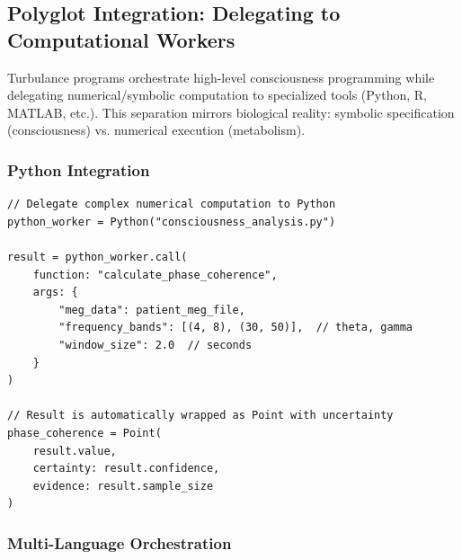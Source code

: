 \subsection{Polyglot Integration: Delegating to Computational Workers}

\begin{theorem}
\label{thm:computational_delegation}
Turbulance programs orchestrate high-level consciousness programming while delegating numerical/symbolic computation to specialized tools (Python, R, MATLAB, etc.). This separation mirrors biological reality: symbolic specification (consciousness) vs. numerical execution (metabolism).
\end{theorem}

\subsubsection{Python Integration}

\begin{verbatim}
// Delegate complex numerical computation to Python
python_worker = Python("consciousness_analysis.py")

result = python_worker.call(
    function: "calculate_phase_coherence",
    args: {
        "meg_data": patient_meg_file,
        "frequency_bands": [(4, 8), (30, 50)],  // theta, gamma
        "window_size": 2.0  // seconds
    }
)

// Result is automatically wrapped as Point with uncertainty
phase_coherence = Point(
    result.value,
    certainty: result.confidence,
    evidence: result.sample_size
)
\end{verbatim}

\subsubsection{Multi-Language Orchestration}

